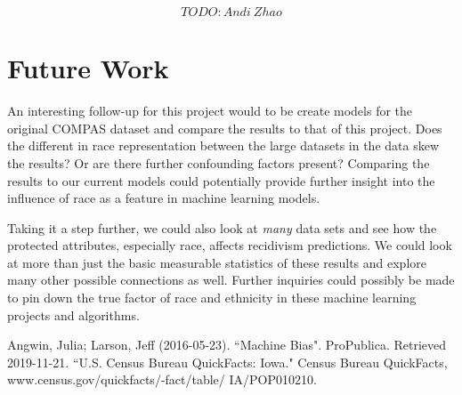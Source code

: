 \documentclass[11pt, sigconf]{acmart}
\begin{document}
$$TODO: Andi~Zhao$$


\section{Future Work}

\hspace{5mm}An interesting follow-up for this project would to be create models for the original COMPAS dataset and compare the results to that of this project. Does the different in race representation between the large datasets in the data skew the results? Or are there further confounding factors present? Comparing the results to our current models could potentially provide further insight into the influence of race as a feature in machine learning models. 

Taking it a step further, we could also look at \emph{many} data sets and see how the protected attributes, especially race, affects recidivism predictions. We could look at more than just the basic measurable statistics of these results and explore many other possible connections as well. Further inquiries could possibly be made to pin down the true factor of race and ethnicity in these machine learning projects and algorithms. 



\begin{thebibliography}{1}

Angwin, Julia; Larson, Jeff (2016-05-23). ``Machine Bias". ProPublica. Retrieved 2019-11-21.
``U.S. Census Bureau QuickFacts: Iowa." Census Bureau QuickFacts, www.census.gov/quickfacts/-fact/table/
IA/POP010210.

\end{thebibliography}
\end{document}
